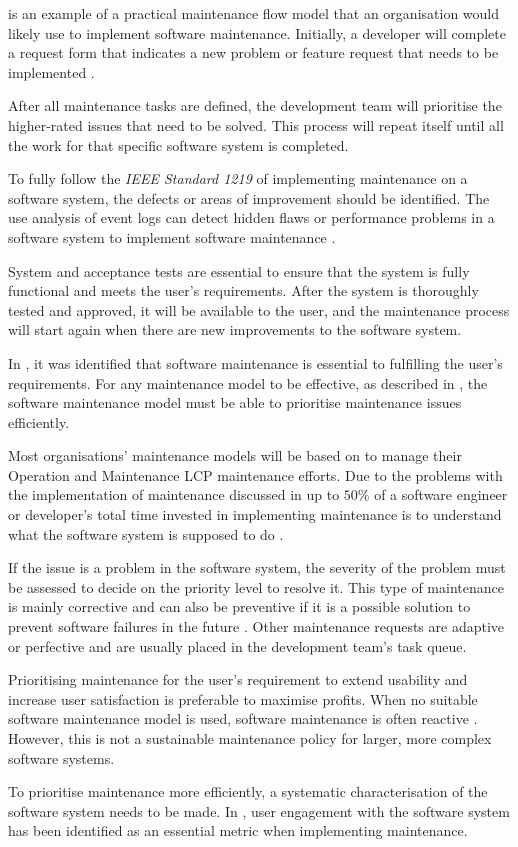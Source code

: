  is an example of a practical maintenance flow model that an organisation would likely use to implement software maintenance. Initially, a developer will complete a request form that indicates a new problem or feature request that needs to be implemented \cite{Tang2010}. \par After all maintenance tasks are defined, the development team will prioritise the higher-rated issues that need to be solved. This process will repeat itself until all the work for that specific software system is completed.\par To fully follow the \textit{IEEE Standard 1219} of implementing maintenance on a software system, the defects or areas of improvement should be identified. The use analysis of event logs can detect hidden flaws or performance problems in a software system to implement software maintenance \cite{Cinque2013, Rong2018a, Levin2019}.\par System and acceptance tests are essential to ensure that the system is fully functional and meets the user's requirements. After the system is thoroughly tested and approved, it will be available to the user, and the maintenance process will start again when there are new improvements to the software system.\par In , it was identified that software maintenance is essential to fulfilling the user's requirements. For any maintenance model to be effective, as described in , the software maintenance model must be able to prioritise maintenance issues efficiently. \par Most organisations' maintenance models will be based on  to manage their Operation and Maintenance LCP maintenance efforts. Due to the problems with the implementation of maintenance discussed in  up to $50\%$ of a software engineer or developer's total time invested in implementing maintenance is to understand what the software system is supposed to do \cite{Tang2010}. \par If the issue is a problem in the software system, the severity of the problem must be assessed to decide on the priority level to resolve it. This type of maintenance is mainly corrective and can also be preventive if it is a possible solution to prevent software failures in the future \cite{Tang2010}. Other maintenance requests are adaptive or perfective and are usually placed in the development team's task queue. \par Prioritising maintenance for the user's requirement to extend usability and increase user satisfaction is preferable to maximise profits. When no suitable software maintenance model is used, software maintenance is often reactive \cite{Araujo2021}. However, this is not a sustainable maintenance policy for larger, more complex software systems. \par To prioritise maintenance more efficiently, a systematic characterisation of the software system needs to be made. In , user engagement with the software system has been identified as an essential metric when implementing maintenance.

